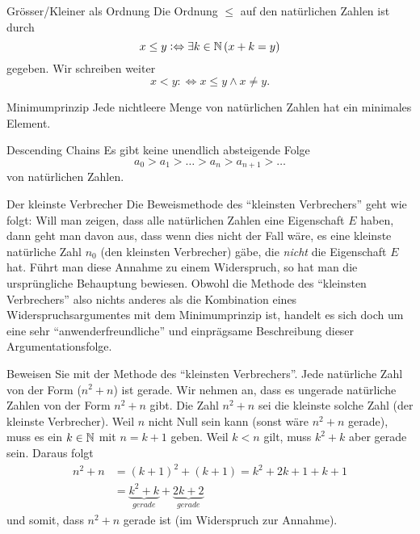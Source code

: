 \begin{definition}{Grösser/Kleiner als Ordnung}
    Die Ordnung $\leq$ auf den natürlichen Zahlen ist durch
    \[
        x\leq y:\Leftrightarrow \exists k\in\mathbb{N}\,(x+k=y)
    \]
    gegeben. Wir schreiben weiter
    \[
        x<y:\Leftrightarrow x\leq y\land x\neq y.
    \]
\end{definition}

\begin{lemma}{Minimumprinzip}
    Jede nichtleere Menge von natürlichen Zahlen hat ein minimales Element.
\end{lemma}

\begin{lemma}{Descending Chains}
    Es gibt keine unendlich absteigende Folge
    \[
        a_0>a_1>\dots >a_n>a_{n+1}>\dots
    \]
    von natürlichen Zahlen.
\end{lemma}

\begin{howto}{Der kleinste Verbrecher}
    Die Beweismethode des ``kleinsten Verbrechers'' geht wie folgt: Will man zeigen, dass alle natürlichen Zahlen eine Eigenschaft $E$ haben, dann geht man davon aus, dass wenn dies nicht der Fall wäre, es eine kleinste natürliche Zahl $n_0$ (den kleinsten Verbrecher) gäbe, die \textit{nicht} die Eigenschaft $E$ hat. Führt man diese Annahme zu einem Widerspruch, so hat man die ursprüngliche Behauptung bewiesen. Obwohl die Methode des ``kleinsten Verbrechers'' also nichts anderes als die Kombination eines Widerspruchsargumentes mit dem Minimumprinzip ist, handelt es sich doch um eine sehr ``anwenderfreundliche'' und einprägsame Beschreibung dieser Argumentationsfolge.
\end{howto}

\begin{example}
    Beweisen Sie mit der Methode des ``kleinsten Verbrechers''.
    Jede natürliche Zahl von der Form ($n^2+n$) ist gerade.
    \tcblower
    Wir nehmen an, dass es ungerade natürliche Zahlen von der Form $n^2+n$ gibt. Die Zahl $n^2+n$ sei die kleinste solche Zahl (der kleinste Verbrecher). Weil $n$ nicht Null sein kann (sonst wäre $n^2+n$ gerade), muss es ein $k\in \mathbb{N} $ mit $n=k+1$ geben. Weil $k<n$ gilt, muss $k^2+k$ aber gerade sein. Daraus folgt
    \begin{align*}
        n^2+n &= (k+1)^2+(k+1)= k^2 + 2k + 1 + k + 1\\
        &= \underbrace{k^2+k}_{gerade}+\underbrace{2k+2}_{gerade}
    \end{align*}
    und somit, dass $n^2+n$ gerade ist (im Widerspruch zur Annahme).
\end{example}

